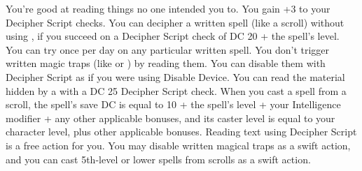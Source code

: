 {You're good at reading things no one intended you to.}
{You gain +3 to your Decipher Script checks.}
{You can decipher a written spell (like a scroll) without using , if you succeed on a Decipher Script check of DC 20 + the spell's level. You can try once per day on any particular written spell.}
{You don't trigger written magic traps (like  or ) by reading them. You can disable them with Decipher Script as if you were using Disable Device. You can read the material hidden by a  with a DC 25 Decipher Script check.}
{When you cast a spell from a scroll, the spell's save DC is equal to 10 + the spell's level + your Intelligence modifier + any other applicable bonuses, and its caster level is equal to your character level, plus other applicable bonuses.}
{Reading text using Decipher Script is a free action for you. You may disable written magical traps as a swift action, and you can cast 5th-level or lower spells from scrolls as a swift action.}